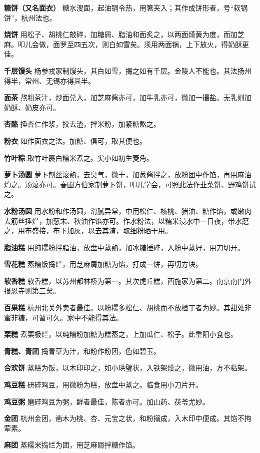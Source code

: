 \documentclass[]{article}
\begin{document}
\textbf{糖饼（又名面衣）}
糖水溲面，起油锅令热，用箸夹入；其作成饼形者，号``软锅饼''，杭州法也。

\textbf{烧饼}
用松子、胡桃仁敲碎，加糖屑、脂油和面炙之，以两面熯黄为度，而加芝麻。叩儿会做，面罗至四五次，则白如雪矣。须用两面锅，上下放火，得奶酥更佳。

\textbf{千层馒头}
杨参戎家制馒头，其白如雪，揭之如有千层。金陵人不能也。其法扬州得半，常州、无锡亦得其半。

\textbf{面茶}
熬粗茶汁，炒面兑入，加芝麻酱亦可，加牛乳亦可，微加一撮盐。无乳则加奶酥、奶皮亦可。

\textbf{杏酪} 捶杏仁作浆，挍去渣，拌米粉，加紧糖熬之。

\textbf{粉衣} 如作面衣之法。加糖、俱可，取其便也。

\textbf{竹叶粽} 取竹叶裹白糯米煮之。尖小如初生菱角。

\textbf{萝卜汤圆}
萝卜刨丝滚熟，去臭气，微干，加葱酱拌之，放粉团中作馅，再用麻油灼之。汤滚亦可。春圃方伯家制萝卜饼，叩儿学会，可照此法作韭菜饼、野鸡饼试之。

\textbf{水粉汤圆}
用水粉和作汤圆，滑腻异常，中用松仁、核桃、猪油、糖作馅，或嫩肉去筋丝捶烂，加葱末、秋油作馅亦可。作水粉法，以糯米浸水中一日夜，带水磨之，用布盛接，布下加灰，以去其渣，取细粉晒干用。

\textbf{脂油糕}
用纯糯粉拌脂油，放盘中蒸熟，加冰糖捶碎，入粉中蒸好，用刀切开。

\textbf{雪花糕} 蒸糯饭捣烂，用芝麻屑加糖为馅，打成一饼，再切方块。

\textbf{软香糕}
软香糕，以苏州都林桥为第一。其次虎丘糕，西施家为第二。南京南门外报恩寺则第三矣。

\textbf{百果糕}
杭州北关外卖者最佳。以粉糯多松仁、胡桃而不放橙丁者为妙。其甜处非蜜非糖，可暂可久。家中不能得其法。

\textbf{栗糕}
煮栗极烂，以纯糯粉加糖为糕蒸之，上加瓜仁、松子。此重阳小食也。

\textbf{青糕、青团} 捣青草为汁，和粉作粉团，色如碧玉。

\textbf{合欢饼}
蒸糕为饭，以木印印之，如小珙璧状，入铁架熯之，微用油，方不粘架。

\textbf{鸡豆糕} 研碎鸡豆，用微粉为糕，放盘中蒸之。临食用小刀片开。

\textbf{鸡豆粥} 磨碎鸡豆为粥，鲜者最佳，陈者亦可。加山药、茯苓尤妙。

\textbf{金团}
杭州金团，凿木为桃、杏、元宝之状，和粉搦成，入木印中便成。其馅不拘荤素。

\textbf{麻团} 蒸糯米捣烂为团，用芝麻屑拌糖作馅。
\end{document}
